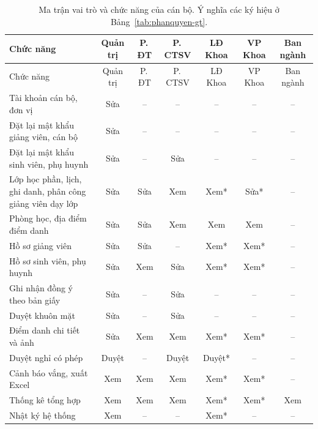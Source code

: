 {\footnotesize
\setlength{\tabcolsep}{4pt}
\begin{xltabular}{\textwidth}{@{}>{\raggedright\arraybackslash}X cccccc@{}}
\caption{Ma trận vai trò và chức năng của cán bộ. Ý nghĩa các ký hiệu ở
Bảng~\ref{tab:phanquyen-gt}.}
\label{tab:phanquyen}\\
\toprule
Chức năng & Quản trị & P.\,ĐT & P.\,CTSV & LĐ Khoa & VP Khoa & Ban ngành \\
\midrule
\endfirsthead
\toprule
Chức năng & Quản trị & P.\,ĐT & P.\,CTSV & LĐ Khoa & VP Khoa & Ban ngành \\
\midrule
\endhead
\bottomrule
\endfoot
Tài khoản cán bộ, đơn vị            & Sửa   & --  & --    & --     & --   & -- \\
Đặt lại mật khẩu giảng viên, cán bộ & Sửa   & --  & --    & --     & --   & -- \\
Đặt lại mật khẩu sinh viên, phụ huynh & Sửa & --  & Sửa   & --     & --   & -- \\
Lớp học phần, lịch, ghi danh,
  phân công giảng viên dạy lớp      & Sửa   & Sửa & Xem   & Xem*   & Sửa* & -- \\
Phòng học, địa điểm điểm danh       & Sửa   & Sửa & Xem   & Xem    & Xem  & -- \\
Hồ sơ giảng viên                    & Sửa   & Sửa & --    & Xem*   & Xem* & -- \\
Hồ sơ sinh viên, phụ huynh          & Sửa   & Xem & Sửa   & Xem*   & Xem* & -- \\
Ghi nhận đồng ý theo bản giấy       & Sửa   & --  & Sửa   & --     & --   & -- \\
Duyệt khuôn mặt                     & Sửa   & --  & Sửa   & --     & --   & -- \\
Điểm danh chi tiết và ảnh           & Sửa   & Xem & Xem   & Xem*   & Xem* & -- \\
Duyệt nghỉ có phép                  & Duyệt & --  & Duyệt & Duyệt* & --   & -- \\
Cảnh báo vắng, xuất Excel           & Xem   & Xem & Xem   & Xem*   & Xem* & -- \\
Thống kê tổng hợp                   & Xem   & Xem & Xem   & Xem*   & Xem* & Xem \\
Nhật ký hệ thống                    & Xem   & --  & --    & Xem*   & --   & -- \\
\end{xltabular}}

